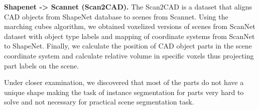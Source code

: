\textbf{Shapenet -> Scannet (Scan2CAD).} The Scan2CAD \cite{avetisyan2019scan2cad} is a dataset that aligns CAD objects from ShapeNet \cite{chang2015shapenet} database to scenes from Scannet. Using the marching cubes algorithm, we obtained  voxelized versions of scenes from ScanNet dataset with object type labels and mapping of coordinate systems from ScanNet to ShapeNet.  Finally, we  calculate the position of CAD object parts in the scene coordinate system and calculate relative volume in specific voxels thus projecting part labels on the scene. 

Under closer examination, we discovered that most of the parts do not have a unique shape making the task of instance segmentation for parts very hard to solve and not necessary for practical scene segmentation task. 
